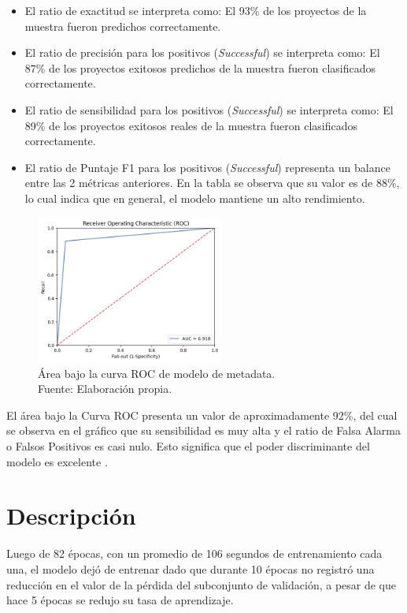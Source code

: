 \begin{itemize}
	\item El ratio de exactitud se interpreta como: El 93\% de los proyectos de la muestra fueron predichos correctamente.
	\item El ratio de precisión para los positivos (\textit{Successful}) se interpreta como: El 87\% de los proyectos exitosos predichos de la muestra fueron clasificados correctamente. 
	\item El ratio de sensibilidad para los positivos (\textit{Successful}) se interpreta como: El 89\% de los proyectos exitosos reales de la muestra fueron clasificados correctamente.
	\item El ratio de Puntaje F1 para los positivos (\textit{Successful}) representa un balance entre las 2 métricas anteriores. En la tabla se observa que su valor es de 88\%, lo cual indica que en general, el modelo mantiene un alto rendimiento.
\end{itemize}

\begin{figure}[!ht]
	\begin{center}
		\includegraphics[width=0.55\textwidth]{5/figures/metadata_auc.png}
		\caption[Área bajo la curva ROC de modelo de metadata]{Área bajo la curva ROC de modelo de metadata.\\
		Fuente: Elaboración propia.}
		\label{5:fig3}
	\end{center}
\end{figure}

El área bajo la Curva ROC presenta un valor de aproximadamente 92\%, del cual se observa en el gráfico que su sensibilidad es muy alta y el ratio de Falsa Alarma o Falsos Positivos es casi nulo. Esto significa que el poder discriminante del modelo es excelente \parencite{bk_britos2006datamining}.

\section{Descripción}
Luego de 82 épocas, con un promedio de 106 segundos de entrenamiento cada una, el modelo dejó de entrenar dado que durante 10 épocas no registró una reducción en el valor de la pérdida del subconjunto de validación, a pesar de que hace 5 épocas se redujo su tasa de aprendizaje.

